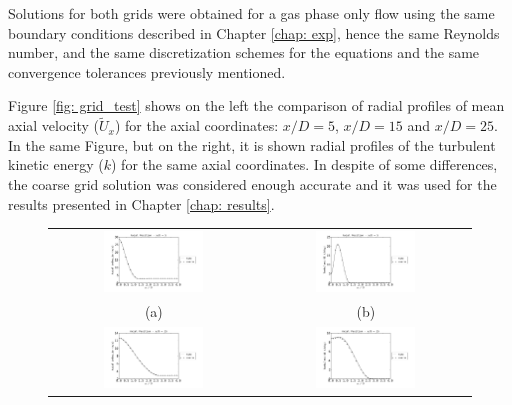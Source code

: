 Solutions for both grids were obtained for a gas phase only flow using the same boundary conditions described in Chapter \ref{chap: exp}, hence the same Reynolds number, and the same discretization schemes for the equations and the same convergence tolerances previously mentioned. 

Figure \ref{fig: grid_test} shows on the left the comparison of radial profiles of mean axial velocity ($\tilde{U}_x$) for the axial coordinates: $x/D=5$, $x/D=15$ and $x/D=25$. In the same Figure, but on the right, it is shown radial profiles of the turbulent kinetic energy ($k$) for the same axial coordinates. In despite of some differences, the coarse grid solution was considered enough accurate and it was used for the results presented in Chapter \ref{chap: results}.

\begin{figure}[h]
 \centering
\begin{tabular}{cc}
 \includegraphics[width=0.5\textwidth]{./figuras/chap4/coarse_fine/grid_0_U.png} & \includegraphics[width=0.5\textwidth]{./figuras/chap4/coarse_fine/grid_0_k.png} \\
(a) & (b) \\
\includegraphics[width=0.5\textwidth]{./figuras/chap4/coarse_fine/grid_2_U.png} & \includegraphics[width=0.5\textwidth]{./figuras/chap4/coarse_fine/grid_2_k.png} \\

\end{tabular}
\end{figure}
